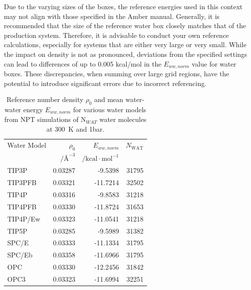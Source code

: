 \documentclass[9pt,tutorial]{livecoms}
\begin{document}
Due to the varying sizes of the boxes, the reference energies used in this context may not align with those specified in the Amber manual. 
Generally, it is recommended that the size of the reference water box closely matches that of the production system.
Therefore, it is advisable to conduct your own reference calculations, especially for systems that are either very large or very small. 
While the impact on density is not as pronounced, deviations from the specified settings can lead to differences of up to 0.005 kcal/mol in the $E_{ww, norm}$ value for water boxes. 
These discrepancies, when summing over large grid regions, have the potential to introduce significant errors due to incorrect referencing.

\begin{table}[h]
	\label{tab:ref_values}
	\caption{Reference number density $\rho_0$ and mean water-water energy $E_{ww, norm}$ for various water models from NPT simulations of N$_{WAT}$ water molecules at \SI{300}{\kelvin} and 1bar.}\label{tab:ref_densities}
	\small
	\begin{tabularx}{\columnwidth}{@{}lrrr@{}}
		\toprule
		Water Model       & $\rho_0$ & $E_{ww, norm}$ & $N_\text{WAT}$ \\
        & $/\text{\AA}^{-3}$ & $/\text{kcal}\cdot \text{mol}^{-1}$ & \\
		\midrule
		TIP3P \cite{Jorgensen1983-tip3p}    & 0.03287 & -9.5398   & 31795 \\
		TIP3PFB \cite{Wang2014-tip3p-force-balance}  & 0.03321 & -11.7214  & 32502 \\
		TIP4P \cite{Jorgensen1985-tip4p}    & 0.03316 & -9.8583   & 31218 \\
       TIP4PFB \cite{Wang2014-tip3p-force-balance} & 0.03330 & -11.8724   & 31653 \\
		TIP4P/Ew \cite{Horn2004-tip4pew} & 0.03323 & -11.0541  & 31218 \\
		TIP5P \cite{Mahoney2000-tip5p}    & 0.03285 & -9.5989   & 31382 \\
		SPC/E \cite{Berendsen1987-spce}    & 0.03333 & -11.1334  & 31795 \\
       SPC/Eb \cite{Takemura2012-spceb}   & 0.03358 & -11.6966 & 31795 \\
		OPC \cite{Izadi2014-opc}      & 0.03330 & -12.2456 & 31842 \\
		OPC3 \cite{Izadi2016-opc3}     & 0.03323 & -11.6994 & 32251 \\
		\bottomrule
	\end{tabularx}
\end{table}
 
\end{document}

